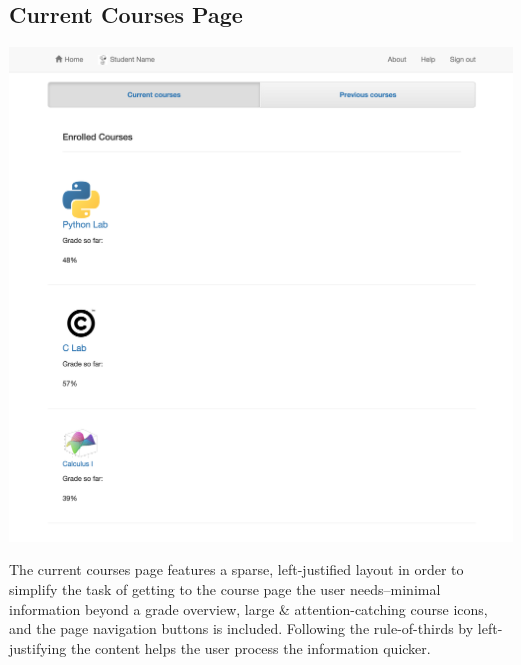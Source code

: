 \subsection{Current Courses Page}

\includegraphics[width=.75\textwidth]{screenshots/CurrentCourses.png}

The current courses page features a sparse, left-justified layout in order to simplify the task of getting to the course page the user needs--minimal information beyond a grade overview, large \& attention-catching course icons, and the page navigation buttons is included. Following the rule-of-thirds by left-justifying the content helps the user process the information quicker.


